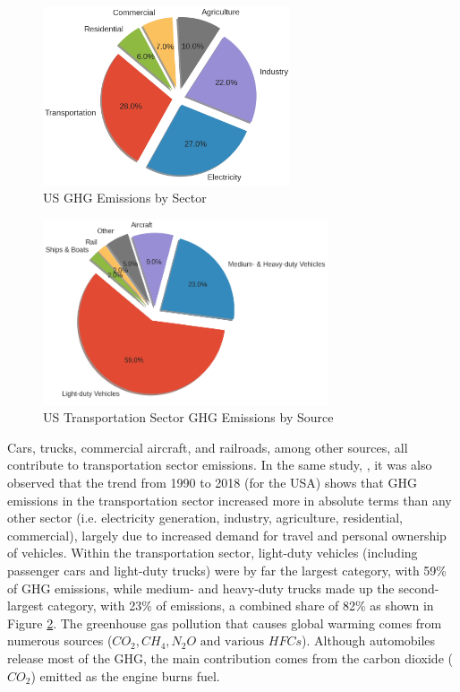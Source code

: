 \begin{figure}[h!]
    \centering
    \includegraphics[width=0.65\textwidth]{Figures/Chp_RNN/US_GHG_Emissions_by_Sector.png}
    \caption{US GHG Emissions by Sector}
    \label{fig:RNN_US_GHG_emissions_sectors}
\end{figure}

\begin{figure}[h!]
    \centering
    \includegraphics[width=0.75\textwidth]{Figures/Chp_RNN/US_Transportation_Sector_GHG_Emissions_by_Source.png}
    \caption{US Transportation Sector GHG Emissions by Source}
    \label{fig:RNN_US_Transportation_Sector_GHG_Emissions_by_Source}
\end{figure}

Cars, trucks, commercial aircraft, and railroads, among other sources, all contribute to transportation sector emissions. In the same study, \parencite{epa2018inventory}, it was also observed that the trend from 1990 to 2018 (for the USA) shows that GHG emissions in the transportation sector increased more in absolute terms than any other sector (i.e. electricity generation, industry, agriculture, residential, commercial), largely due to increased demand for travel and personal ownership of vehicles.  Within the transportation sector, light-duty vehicles (including passenger cars and light-duty trucks) were by far the largest category, with 59\% of GHG emissions, while medium- and heavy-duty trucks made up the second-largest category, with 23\% of emissions, a combined share of 82\% as shown in  Figure \ref{fig:RNN_US_Transportation_Sector_GHG_Emissions_by_Source}. The greenhouse gas pollution that causes global warming comes from numerous sources ($CO_2, CH_4, N_2O \text{ and various } HFCs$). Although automobiles release most of the GHG, the main contribution comes from the carbon dioxide ($CO_2$) emitted as the engine burns fuel. 

